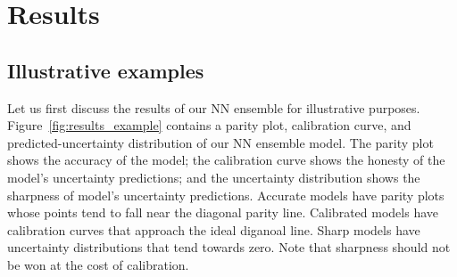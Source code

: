 \documentclass[]{achemso}
\begin{document}

\section{Results}

\subsection{Illustrative examples}

Let us first discuss the results of our \gls{NN} ensemble for illustrative purposes.
Figure~\ref{fig:results_example} contains a parity plot, calibration curve, and predicted-uncertainty distribution of our \gls{NN} ensemble model.
The parity plot shows the accuracy of the model; the calibration curve shows the honesty of the model's uncertainty predictions; and the uncertainty distribution shows the sharpness of model's uncertainty predictions.
Accurate models have parity plots whose points tend to fall near the diagonal parity line.
Calibrated models have calibration curves that approach the ideal diganoal line.
Sharp models have uncertainty distributions that tend towards zero.
Note that sharpness should not be won at the cost of calibration.
\end{document}
